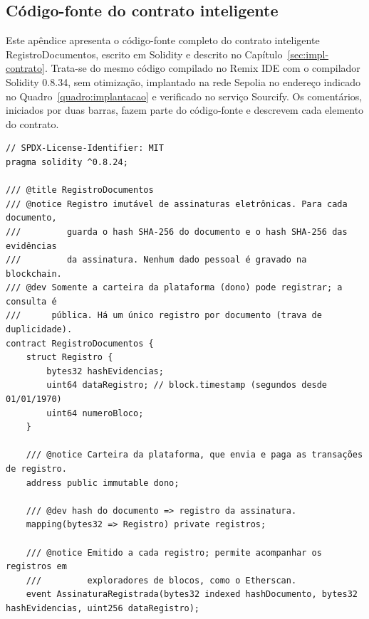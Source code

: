 \documentclass[
    12pt,
    a4paper,
    oneside,
    chapter=TITLE,
    section=TITLE,
    subsection=TITLE,
    subsubsection=TITLE,
    sumario=tradicional,
    english,
    brazil
]{abntex2}
\begin{document}
\postextual



\begin{apendicesenv}

\chapter{Código-fonte do contrato inteligente}
\label{ap:contrato}

Este apêndice apresenta o código-fonte completo do contrato inteligente RegistroDocumentos, escrito em Solidity e descrito no Capítulo~\ref{sec:impl-contrato}. Trata-se do mesmo código compilado no Remix IDE com o compilador Solidity 0.8.34, sem otimização, implantado na rede Sepolia no endereço indicado no Quadro~\ref{quadro:implantacao} e verificado no serviço Sourcify. Os comentários, iniciados por duas barras, fazem parte do código-fonte e descrevem cada elemento do contrato.

\begin{lstlisting}[style=codigo]
// SPDX-License-Identifier: MIT
pragma solidity ^0.8.24;

/// @title RegistroDocumentos
/// @notice Registro imutável de assinaturas eletrônicas. Para cada documento,
///         guarda o hash SHA-256 do documento e o hash SHA-256 das evidências
///         da assinatura. Nenhum dado pessoal é gravado na blockchain.
/// @dev Somente a carteira da plataforma (dono) pode registrar; a consulta é
///      pública. Há um único registro por documento (trava de duplicidade).
contract RegistroDocumentos {
    struct Registro {
        bytes32 hashEvidencias;
        uint64 dataRegistro; // block.timestamp (segundos desde 01/01/1970)
        uint64 numeroBloco;
    }

    /// @notice Carteira da plataforma, que envia e paga as transações de registro.
    address public immutable dono;

    /// @dev hash do documento => registro da assinatura.
    mapping(bytes32 => Registro) private registros;

    /// @notice Emitido a cada registro; permite acompanhar os registros em
    ///         exploradores de blocos, como o Etherscan.
    event AssinaturaRegistrada(bytes32 indexed hashDocumento, bytes32 hashEvidencias, uint256 dataRegistro);


\end{lstlisting}
\end{apendicesenv}
\end{document}
